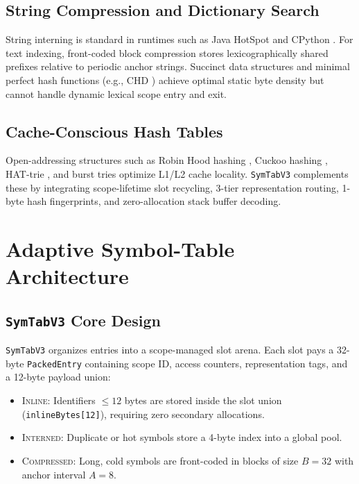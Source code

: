 \documentclass[conference]{IEEEtran}
\begin{document}
\subsection{String Compression and Dictionary Search}
String interning is standard in runtimes such as Java HotSpot \cite{gosling2014java} and CPython \cite{vanrossum2009python}. For text indexing, front-coded block compression \cite{witten1999managing, brisaboa2011compressed, martinez2016practical} stores lexicographically shared prefixes relative to periodic anchor strings. Succinct data structures \cite{ferragina2000opportunistic, grossi2005compressed} and minimal perfect hash functions (e.g., CHD \cite{botelho2009simple}) achieve optimal static byte density but cannot handle dynamic lexical scope entry and exit.

\subsection{Cache-Conscious Hash Tables}
Open-addressing structures such as Robin Hood hashing \cite{celis1986robin}, Cuckoo hashing \cite{pagh2001cuckoo}, HAT-trie \cite{askitis2007hat}, and burst tries \cite{heinz2002burst} optimize L1/L2 cache locality. \texttt{SymTabV3} complements these by integrating scope-lifetime slot recycling, 3-tier representation routing, 1-byte hash fingerprints, and zero-allocation stack buffer decoding.

\section{Adaptive Symbol-Table Architecture}

\subsection{\texttt{SymTabV3} Core Design}
\texttt{SymTabV3} organizes entries into a scope-managed slot arena. Each slot pays a 32-byte \texttt{PackedEntry} containing scope ID, access counters, representation tags, and a 12-byte payload union:
\begin{itemize}
    \item \textsc{Inline}: Identifiers $\le 12$ bytes are stored inside the slot union (\texttt{inlineBytes[12]}), requiring zero secondary allocations.
    \item \textsc{Interned}: Duplicate or hot symbols store a 4-byte index into a global pool.
    \item \textsc{Compressed}: Long, cold symbols are front-coded in blocks of size $B=32$ with anchor interval $A=8$.
\end{itemize}
\end{document}
